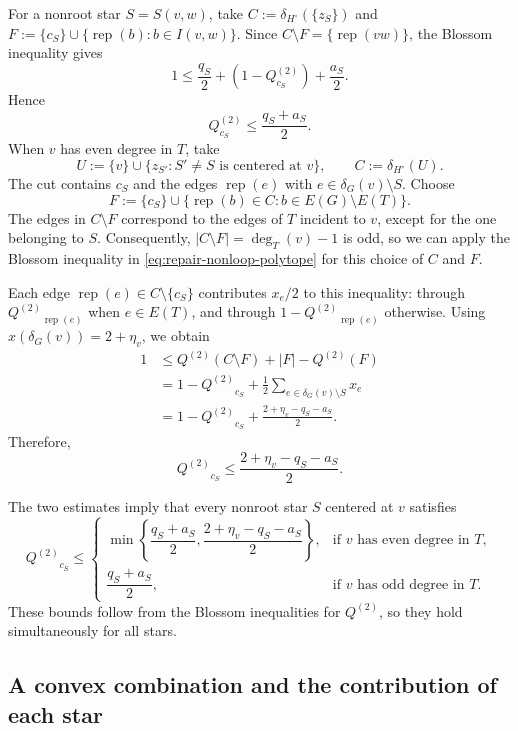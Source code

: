 \documentclass[11pt]{amsart}
\newcommand{\rep}[1]{\operatorname{rep}(#1)}
\newcommand{\1}{\mathbbm{1}}
\begin{document}
{For a nonroot star $S=S(v,w)$, take
$C:=\delta_{H^\circ}(\{z_S\})$ and
$F:=\{c_S\}\cup\{\rep{b}:b\in I(v,w)\}$.
Since $C\setminus F=\{\rep{vw}\}$, the Blossom inequality gives
\[
 1\le\frac{q_S}{2}+(1-Q^{(2)}_{c_S})+\frac{a_S}{2}.
\]
Hence
\begin{equation}\label{s10:Q-connector-basic}
 Q^{(2)}_{c_S}\le\frac{q_S+a_S}{2}.
\end{equation}
When $v$ has even degree in $T$, take}
\[
 U:=\{v\}\cup
   \{z_{S'}:S'\ne S\text{ is centered at }v\},
 \qquad
 C:=\delta_{H^\circ}(U).
\]
The cut contains $c_S$ and the edges $\rep{e}$ with
$e\in\delta_G(v)\setminus S$. Choose
\[
 F:=\{c_S\}\cup
   \{\rep{b}\in C:b\in E(G)\setminus E(T)\}.
\]
The edges in $C\setminus F$ correspond to the edges of $T$
incident to $v$, except for the one belonging to $S$.
Consequently, $|C\setminus F|=\deg_T(v)-1$ is odd, so
we can apply the Blossom inequality in
\eqref{eq:repair-nonloop-polytope} for this choice of $C$ and $F$.

Each edge $\rep{e}\in C\setminus\{c_S\}$ contributes
$x_e/2$ to this inequality: through ${Q^{(2)}}_{\rep{e}}$ when
$e\in E(T)$, and through $1-{Q^{(2)}}_{\rep{e}}$ otherwise.
Using $x(\delta_G(v))=2+\eta_v$, we obtain
\[
 \begin{aligned}
 1
 &\le {Q^{(2)}}(C\setminus F)+|F|-{Q^{(2)}}(F)\\
 &=1-{Q^{(2)}}_{c_S}
   +\frac12\sum_{e\in\delta_G(v)\setminus S}x_e\\
 &=1-{Q^{(2)}}_{c_S}
   +\frac{2+\eta_v-q_S-a_S}{2}.
 \end{aligned}
\]
Therefore,
\[
 {Q^{(2)}}_{c_S}\le\frac{2+\eta_v-q_S-a_S}{2}.
\]

The two estimates imply that every nonroot star $S$
centered at $v$ satisfies
\begin{equation}\label{s12pair:Q-connector-bounds}
 {Q^{(2)}}_{c_S}\le
 \begin{cases}
  \min\left\{\dfrac{q_S+a_S}{2},
             \dfrac{2+\eta_v-q_S-a_S}{2}\right\},
      &\text{if $v$ has even degree in $T$},\\[10pt]
  \dfrac{q_S+a_S}{2},
      &\text{if $v$ has odd degree in $T$}.
 \end{cases}
\end{equation}
These bounds follow from the Blossom inequalities for ${Q^{(2)}}$,
so they hold simultaneously for all stars.


\subsection{A convex combination and the contribution of each star}
\end{document}
